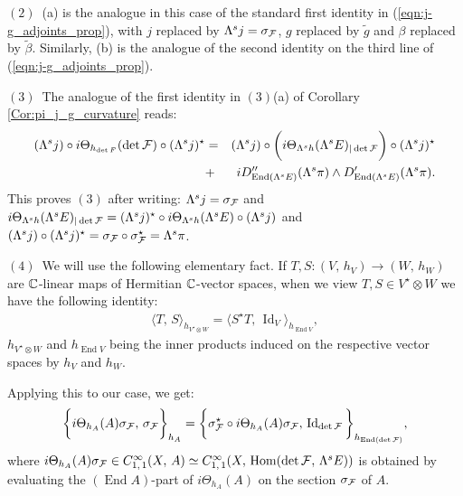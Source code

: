 \documentclass[12pt]{article}
\begin{document}
\vspace{1ex}

$(2)$\, (a) is the analogue in this case of the standard first identity in (\ref{eqn:j-g_adjoints_prop}), with $j$ replaced by $\Lambda^sj= \sigma_{\cal F}$, $g$ replaced by $\widetilde{g}$ and $\beta$ replaced by $\widetilde\beta$. Similarly, (b) is the analogue of the second identity on the third line of (\ref{eqn:j-g_adjoints_prop}).

\vspace{1ex}

$(3)$\, The analogue of the first identity in $(3)$(a) of Corollary \ref{Cor:pi_j_g_curvature} reads: \begin{eqnarray*}(\Lambda^sj)\circ i\Theta_{h_{\det F}}(\det{\cal F})\circ (\Lambda^sj)^\star & = & (\Lambda^sj)\circ\bigg(i\Theta_{\Lambda^sh}(\Lambda^sE)_{|\det {\cal F}}\bigg)\circ(\Lambda^sj)^\star \\
  & + & iD''_{\operatorname{End}(\Lambda^sE)}(\Lambda^s\pi)\wedge D'_{\operatorname{End}(\Lambda^sE)}(\Lambda^s\pi).\end{eqnarray*} This proves $(3)$ after writing: $\Lambda^sj = \sigma_{\cal F}$ and $i\Theta_{\Lambda^sh}(\Lambda^sE)_{|\det {\cal F}} = (\Lambda^sj)^\star\circ i\Theta_{\Lambda^sh}(\Lambda^sE)\circ (\Lambda^sj)$ and $(\Lambda^sj)\circ(\Lambda^sj)^\star = \sigma_{\cal F}\circ\sigma_{\cal F}^\star = \Lambda^s\pi$.


\vspace{1ex}

$(4)$\, We will use the following elementary fact. If $T,S:(V,\,h_V)\longrightarrow(W,\,h_W)$ are $\mathbb{C}$-linear maps of Hermitian $\mathbb{C}$-vector spaces, when we view $T,S\in V^\star\otimes W$ we have the following identity: \begin{eqnarray}\label{eqn:T-S-S-star-T-Id_inner-prod}\langle T,\,S\rangle_{h_{V^\star\otimes W}} = \langle S^\star T,\,\operatorname{Id}_V\rangle_{h_{\operatorname{End}V}},\end{eqnarray} $h_{V^\star\otimes W}$ and $h_{\operatorname{End}V}$ being the inner products induced on the respective vector spaces by $h_V$ and $h_W$.

Applying this to our case, we get: \begin{eqnarray}\label{Cor:Lambda_s_exact-seq_proof_1}\bigg\{i\Theta_{h_A}(A)\sigma_{\cal F},\,\sigma_{\cal F}\bigg\}_{h_A} = \bigg\{\sigma_{\cal F}^\star\circ i\Theta_{h_A}(A)\sigma_{\cal F},\,\operatorname{Id}_{\det{\cal F}}\bigg\}_{h_{\operatorname{End}(\det{\cal F})}},\end{eqnarray} where $i\Theta_{h_A}(A)\sigma_{\cal F}\in C^\infty_{1,\,1}(X,\,A)\simeq C^\infty_{1,\,1}(X,\,\operatorname{Hom}(\det{\cal F},\,\Lambda^sE))$ is obtained by evaluating the $(\operatorname{End}A)$-part of $i\Theta_{h_A}(A)$ on the section $\sigma_{\cal F}$ of $A$.
\end{document}
